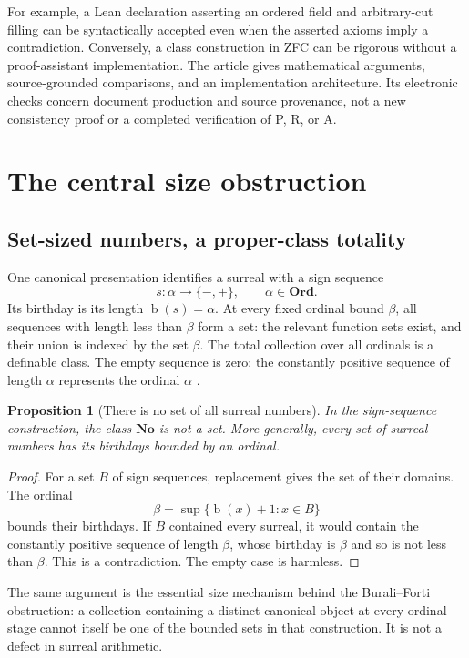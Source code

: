\documentclass[11pt,letterpaper]{article}
\numberwithin{equation}{section}
\newtheorem{proposition}[theorem]{Proposition}
\theoremstyle{definition}
\theoremstyle{remark}
\newcommand{\No}{\mathbf{No}}
\newcommand{\Ord}{\mathbf{Ord}}
\newcommand{\bd}{\operatorname{b}}
\begin{document}
For example, a Lean declaration asserting an ordered field and arbitrary-cut filling can be syntactically accepted even when the asserted axioms imply a contradiction. Conversely, a class construction in ZFC can be rigorous without a proof-assistant implementation. The article gives mathematical arguments, source-grounded comparisons, and an implementation architecture. Its electronic checks concern document production and source provenance, not a new consistency proof or a completed verification of P, R, or A.

\section{The central size obstruction}\label{sec:size}

\subsection{Set-sized numbers, a proper-class totality}
One canonical presentation identifies a surreal with a sign sequence
\[
s:\alpha\longrightarrow\{-,+\},\qquad \alpha\in\Ord.
\]
Its birthday is its length $\bd(s)=\alpha$. At every fixed ordinal bound $\beta$, all sequences with length less than $\beta$ form a set: the relevant function sets exist, and their union is indexed by the set $\beta$. The total collection over all ordinals is a definable class. The empty sequence is zero; the constantly positive sequence of length $\alpha$ represents the ordinal $\alpha$ \cite{Gonshor}.

\begin{proposition}[There is no set of all surreal numbers]\label{prop:proper}
In the sign-sequence construction, the class $\No$ is not a set. More generally, every set of surreal numbers has its birthdays bounded by an ordinal.
\end{proposition}
\begin{proof}
For a set $B$ of sign sequences, replacement gives the set of their domains. The ordinal
\[
\beta=\sup\{\bd(x)+1:x\in B\}
\]
bounds their birthdays. If $B$ contained every surreal, it would contain the constantly positive sequence of length $\beta$, whose birthday is $\beta$ and so is not less than $\beta$. This is a contradiction. The empty case is harmless.
\end{proof}
The same argument is the essential size mechanism behind the Burali--Forti obstruction: a collection containing a distinct canonical object at every ordinal stage cannot itself be one of the bounded sets in that construction. It is not a defect in surreal arithmetic.
\end{document}
